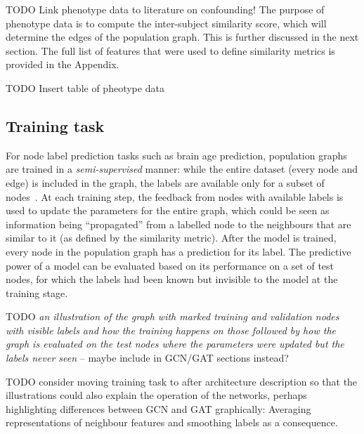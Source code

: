 TODO Link phenotype data to literature on confounding!
The purpose of phenotype data is to compute the inter-subject similarity score, which will determine the edges of the population graph. This is further discussed in the next section. The full list of features that were used to define similarity metrics is provided in the Appendix.

TODO Insert table of pheotype data




\subsection{Training task}
\label{training-task}


For node label prediction tasks such as brain age prediction, population graphs are trained in a \textit{semi-supervised} manner: while the entire dataset (every node and edge) is included in the graph, the labels are available only for a subset of nodes~\cite{kipf2017semi}. At each training step, the feedback from nodes with available labels is used to update the parameters for the entire graph, which could be seen as information being ``propagated'' from a labelled node to the neighbours that are similar to it (as defined by the similarity metric). After the model is trained, every node in the population graph has a prediction for its label. The predictive power of a model can be evaluated based on its performance on a set of test nodes, for which the labels had been known but invisible to the model at the training stage.


TODO \textit{an illustration of the graph with marked training and validation nodes with visible labels and how the training happens on those followed by how the graph is evaluated on the test nodes where the parameters were updated but the labels never seen} – maybe include in GCN/GAT sections instead?

TODO consider moving training task to after architecture description so that the illustrations could also explain the operation of the networks, perhaps highlighting differences between GCN and GAT graphically: Averaging representations of neighbour features and smoothing labels as a consequence.~\cite{wu2019simplifying}


